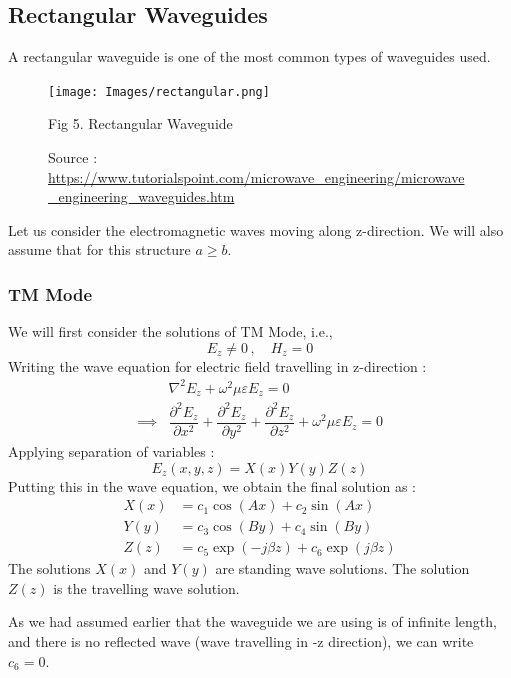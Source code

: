 \documentclass[12pt]{article}
\begin{document}
\subsection{Rectangular Waveguides}
A rectangular waveguide is one of the most common types of waveguides used. 
\begin{figure}[H]
  \centering
  \texttt{[image: Images/rectangular.png]}
  \caption{Fig 5. Rectangular Waveguide}
  \caption{\tiny Source : \url{https://www.tutorialspoint.com/microwave_engineering/microwave_engineering_waveguides.htm}}
\end{figure}
Let us consider the electromagnetic waves moving along z-direction. \linebreak
We will also assume that for this structure $a\geq b$.\linebreak
\subsubsection{TM Mode} %
We will first consider the solutions of TM Mode, i.e.,
\begin{equation*}
  E_z\neq 0 \, , \quad H_z=0
\end{equation*}
Writing the wave equation for electric field travelling in z-direction :
\begin{align*}
  & \nabla^2 E_z + \omega^2 \mu \varepsilon E_z =0 \\
  \implies & \dfrac{\partial^2 E_z}{\partial x^2}+\dfrac{\partial^2 E_z}{\partial y^2}+\dfrac{\partial^2 E_z}{\partial z^2}+\omega^2 \mu \varepsilon E_z=0 
\end{align*}
Applying separation of variables :
\begin{equation*}
  E_z(x,y,z) = X(x)Y(y)Z(z) 
\end{equation*}
Putting this in the wave equation, we obtain the final solution as :
\begin{align*}
  X(x)&= c_1 \cos(Ax)+c_2 \sin(Ax) \\
  Y(y)&= c_3 \cos(By)+c_4 \sin(By) \\
  Z(z)&= c_5 \exp(-j \beta z)+c_6 \exp(j \beta z)
\end{align*}
The solutions $X(x)$ and $Y(y)$ are standing wave solutions. The solution $Z(z)$ is the travelling wave solution.\linebreak

As we had assumed earlier that the waveguide we are using is of infinite length, and there is no reflected wave (wave travelling in -z direction), we can write $c_6=0$. \linebreak
\end{document}
